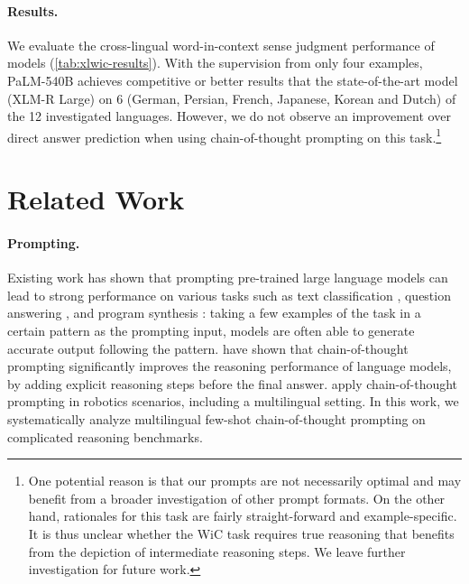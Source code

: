 \paragraph{Results.} We evaluate the cross-lingual word-in-context sense judgment performance of models (\ref{tab:xlwic-results}). 
With the supervision from only four examples, PaLM-540B achieves competitive or better results that the state-of-the-art model (XLM-R Large) on 6 (German, Persian, French, Japanese, Korean and Dutch) of the 12 investigated languages. However, we do not observe an improvement over direct answer prediction when using chain-of-thought prompting on this task.\footnote{One potential reason is that our prompts are not necessarily optimal \citep{wang2022rationale} and may benefit from a broader investigation of other prompt formats. On the other hand, rationales for this task are fairly straight-forward and example-specific. It is thus unclear whether the WiC task requires true reasoning that benefits from the depiction of intermediate reasoning steps. We leave further investigation for future work. }

\section{Related Work}
\paragraph{Prompting.}
Existing work \citep[\textit{inter alia}]{radford2019language,brown2020language,schick-schutze-2021-just} has shown that prompting pre-trained large language models can lead to strong performance on various tasks such as text classification \citep{shin2020autoprompt,gao-etal-2021-making}, question answering \citep{khashabi-etal-2020-unifiedqa}, and program synthesis \citep{austin2021program,nye2021show,shi2022natural}: taking a few examples of the task in a certain pattern as the prompting input, models are often able to generate accurate output following the pattern. 
\citet{wei2022chain} have shown that chain-of-thought prompting significantly improves the reasoning performance of language models, by adding explicit reasoning steps before the final answer. 
\citet{ahn2022can} apply chain-of-thought prompting in robotics scenarios, including a multilingual setting. In this work, we systematically analyze multilingual few-shot chain-of-thought prompting on complicated reasoning benchmarks. 

